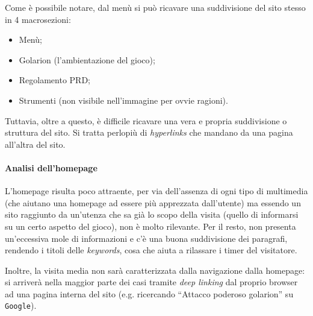 Come è possibile notare, dal menù si può ricavare una suddivisione del sito stesso in 4 macrosezioni:
\begin{itemize}[noitemsep]
    \item Menù;
    \item Golarion (l'ambientazione del gioco);
    \item Regolamento PRD;
    \item Strumenti (non visibile nell'immagine per ovvie ragioni).
\end{itemize}
Tuttavia, oltre a questo, è difficile ricavare una vera e propria suddivisione o struttura del sito. 
Si tratta perlopiù di \emph{hyperlinks} che mandano da una pagina all'altra del sito.

\paragraph{Analisi dell'homepage} L'homepage risulta poco attraente, per via dell'assenza di ogni tipo di multimedia
(che aiutano una homepage ad essere più apprezzata dall'utente) ma essendo un sito raggiunto da
un'utenza che sa già lo scopo della visita (quello di informarsi su un certo aspetto del gioco), non è molto rilevante. 
Per il resto, non presenta un'eccessiva mole di informazioni e c'è una buona suddivisione dei paragrafi, rendendo i 
titoli delle \emph{keywords}, cosa che aiuta a rilassare i timer del visitatore.\par 
Inoltre, la visita media non sarà caratterizzata dalla navigazione dalla homepage: si arriverà nella maggior parte 
dei casi tramite \emph{deep linking} dal proprio browser ad una pagina interna del sito (e.g. ricercando ``Attacco poderoso golarion''
su \texttt{Google}).
